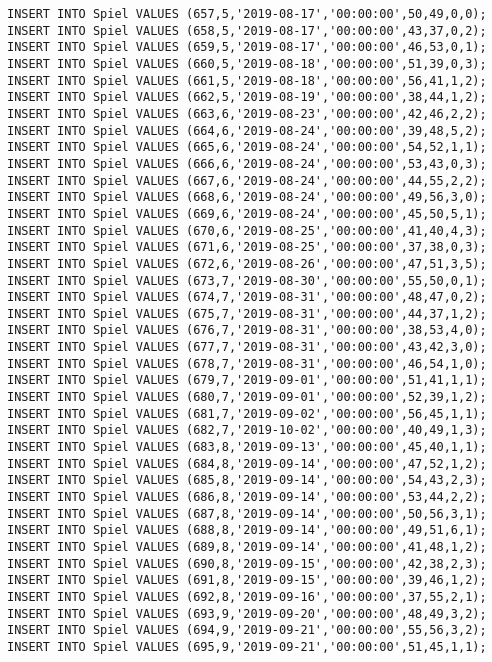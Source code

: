 \documentclass{lehramt-informatik-aufgabe}
\begin{document}
\begin{verbatim}
INSERT INTO Spiel VALUES (657,5,'2019-08-17','00:00:00',50,49,0,0);
INSERT INTO Spiel VALUES (658,5,'2019-08-17','00:00:00',43,37,0,2);
INSERT INTO Spiel VALUES (659,5,'2019-08-17','00:00:00',46,53,0,1);
INSERT INTO Spiel VALUES (660,5,'2019-08-18','00:00:00',51,39,0,3);
INSERT INTO Spiel VALUES (661,5,'2019-08-18','00:00:00',56,41,1,2);
INSERT INTO Spiel VALUES (662,5,'2019-08-19','00:00:00',38,44,1,2);
INSERT INTO Spiel VALUES (663,6,'2019-08-23','00:00:00',42,46,2,2);
INSERT INTO Spiel VALUES (664,6,'2019-08-24','00:00:00',39,48,5,2);
INSERT INTO Spiel VALUES (665,6,'2019-08-24','00:00:00',54,52,1,1);
INSERT INTO Spiel VALUES (666,6,'2019-08-24','00:00:00',53,43,0,3);
INSERT INTO Spiel VALUES (667,6,'2019-08-24','00:00:00',44,55,2,2);
INSERT INTO Spiel VALUES (668,6,'2019-08-24','00:00:00',49,56,3,0);
INSERT INTO Spiel VALUES (669,6,'2019-08-24','00:00:00',45,50,5,1);
INSERT INTO Spiel VALUES (670,6,'2019-08-25','00:00:00',41,40,4,3);
INSERT INTO Spiel VALUES (671,6,'2019-08-25','00:00:00',37,38,0,3);
INSERT INTO Spiel VALUES (672,6,'2019-08-26','00:00:00',47,51,3,5);
INSERT INTO Spiel VALUES (673,7,'2019-08-30','00:00:00',55,50,0,1);
INSERT INTO Spiel VALUES (674,7,'2019-08-31','00:00:00',48,47,0,2);
INSERT INTO Spiel VALUES (675,7,'2019-08-31','00:00:00',44,37,1,2);
INSERT INTO Spiel VALUES (676,7,'2019-08-31','00:00:00',38,53,4,0);
INSERT INTO Spiel VALUES (677,7,'2019-08-31','00:00:00',43,42,3,0);
INSERT INTO Spiel VALUES (678,7,'2019-08-31','00:00:00',46,54,1,0);
INSERT INTO Spiel VALUES (679,7,'2019-09-01','00:00:00',51,41,1,1);
INSERT INTO Spiel VALUES (680,7,'2019-09-01','00:00:00',52,39,1,2);
INSERT INTO Spiel VALUES (681,7,'2019-09-02','00:00:00',56,45,1,1);
INSERT INTO Spiel VALUES (682,7,'2019-10-02','00:00:00',40,49,1,3);
INSERT INTO Spiel VALUES (683,8,'2019-09-13','00:00:00',45,40,1,1);
INSERT INTO Spiel VALUES (684,8,'2019-09-14','00:00:00',47,52,1,2);
INSERT INTO Spiel VALUES (685,8,'2019-09-14','00:00:00',54,43,2,3);
INSERT INTO Spiel VALUES (686,8,'2019-09-14','00:00:00',53,44,2,2);
INSERT INTO Spiel VALUES (687,8,'2019-09-14','00:00:00',50,56,3,1);
INSERT INTO Spiel VALUES (688,8,'2019-09-14','00:00:00',49,51,6,1);
INSERT INTO Spiel VALUES (689,8,'2019-09-14','00:00:00',41,48,1,2);
INSERT INTO Spiel VALUES (690,8,'2019-09-15','00:00:00',42,38,2,3);
INSERT INTO Spiel VALUES (691,8,'2019-09-15','00:00:00',39,46,1,2);
INSERT INTO Spiel VALUES (692,8,'2019-09-16','00:00:00',37,55,2,1);
INSERT INTO Spiel VALUES (693,9,'2019-09-20','00:00:00',48,49,3,2);
INSERT INTO Spiel VALUES (694,9,'2019-09-21','00:00:00',55,56,3,2);
INSERT INTO Spiel VALUES (695,9,'2019-09-21','00:00:00',51,45,1,1);

\end{verbatim}
\end{document}
